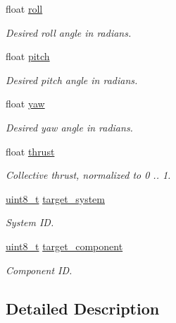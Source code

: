 \begin{DoxyCompactItemize}
\item 
float \hyperlink{struct____mavlink__set__roll__pitch__yaw__thrust__t_ac22187a5d5cf4d397c64916dfb1ebe8d}{roll}
\begin{DoxyCompactList}\small\item\em Desired roll angle in radians. \end{DoxyCompactList}\item 
float \hyperlink{struct____mavlink__set__roll__pitch__yaw__thrust__t_af2758db0f0b898ef21ac0a910a32aa83}{pitch}
\begin{DoxyCompactList}\small\item\em Desired pitch angle in radians. \end{DoxyCompactList}\item 
float \hyperlink{struct____mavlink__set__roll__pitch__yaw__thrust__t_a074887a2e921bb87f711b8cfbdcdb11d}{yaw}
\begin{DoxyCompactList}\small\item\em Desired yaw angle in radians. \end{DoxyCompactList}\item 
float \hyperlink{struct____mavlink__set__roll__pitch__yaw__thrust__t_a8ffcfa5cdc08affb41450ed2a8939c26}{thrust}
\begin{DoxyCompactList}\small\item\em Collective thrust, normalized to 0 .. 1. \end{DoxyCompactList}\item 
\hyperlink{stdint_8h_aba7bc1797add20fe3efdf37ced1182c5}{uint8\-\_\-t} \hyperlink{struct____mavlink__set__roll__pitch__yaw__thrust__t_ac14b9858240b92918decbe4824b72211}{target\-\_\-system}
\begin{DoxyCompactList}\small\item\em System I\-D. \end{DoxyCompactList}\item 
\hyperlink{stdint_8h_aba7bc1797add20fe3efdf37ced1182c5}{uint8\-\_\-t} \hyperlink{struct____mavlink__set__roll__pitch__yaw__thrust__t_a59af37fe8843779a2aca045357ac9c96}{target\-\_\-component}
\begin{DoxyCompactList}\small\item\em Component I\-D. \end{DoxyCompactList}\end{DoxyCompactItemize}


\subsection{Detailed Description}


